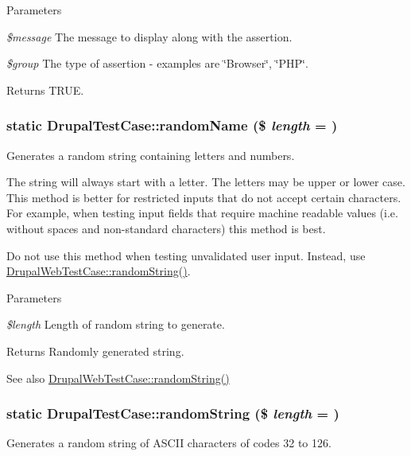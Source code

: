 \begin{DoxyParams}{Parameters}
\item[{\em \$message}]The message to display along with the assertion. \item[{\em \$group}]The type of assertion -\/ examples are \char`\"{}Browser\char`\"{}, \char`\"{}PHP\char`\"{}. \end{DoxyParams}
\begin{DoxyReturn}{Returns}
TRUE. 
\end{DoxyReturn}
\hypertarget{classDrupalTestCase_ab1137ec76434cdd38ec267977ba153d5}{
\subsubsection[{randomName}]{\setlength{\rightskip}{0pt plus 5cm}static DrupalTestCase::randomName (\$ {\em length} = {})}}
\label{classDrupalTestCase_ab1137ec76434cdd38ec267977ba153d5}
Generates a random string containing letters and numbers.

The string will always start with a letter. The letters may be upper or lower case. This method is better for restricted inputs that do not accept certain characters. For example, when testing input fields that require machine readable values (i.e. without spaces and non-\/standard characters) this method is best.

Do not use this method when testing unvalidated user input. Instead, use \hyperlink{classDrupalTestCase_abfa086de79b5d644f10d4bd4d828136c}{DrupalWebTestCase::randomString()}.


\begin{DoxyParams}{Parameters}
\item[{\em \$length}]Length of random string to generate.\end{DoxyParams}
\begin{DoxyReturn}{Returns}
Randomly generated string.
\end{DoxyReturn}
\begin{DoxySeeAlso}{See also}
\hyperlink{classDrupalTestCase_abfa086de79b5d644f10d4bd4d828136c}{DrupalWebTestCase::randomString()} 
\end{DoxySeeAlso}
\hypertarget{classDrupalTestCase_abfa086de79b5d644f10d4bd4d828136c}{
\subsubsection[{randomString}]{\setlength{\rightskip}{0pt plus 5cm}static DrupalTestCase::randomString (\$ {\em length} = {})}}
\label{classDrupalTestCase_abfa086de79b5d644f10d4bd4d828136c}
Generates a random string of ASCII characters of codes 32 to 126.

